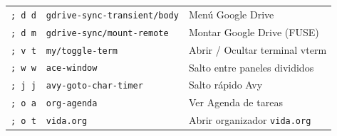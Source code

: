 \documentclass[11pt,book,spanish,alphabetic]{apuntes-scr}
\begin{document}
\begin{center}
\begin{tabularx}{\linewidth}{p{2.0cm} p{4.2cm} X}
\texttt{; d d} & \texttt{gdrive-sync-transient/body} & Menú Google Drive \\
\texttt{; d m} & \texttt{gdrive-sync/mount-remote} & Montar Google Drive (FUSE) \\
\texttt{; v t} & \texttt{my/toggle-term} & Abrir / Ocultar terminal vterm \\
\texttt{; w w} & \texttt{ace-window} & Salto entre paneles divididos \\
\texttt{; j j} & \texttt{avy-goto-char-timer} & Salto rápido Avy \\
\texttt{; o a} & \texttt{org-agenda} & Ver Agenda de tareas \\
\texttt{; o t} & \texttt{vida.org} & Abrir organizador \texttt{vida.org} \\
\bottomrule
\end{tabularx}
\end{center}

\backmatter
\printindex
\end{document}
